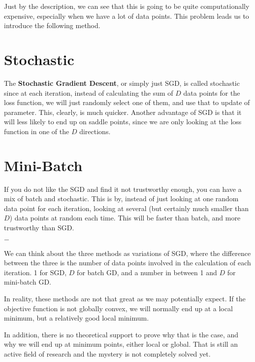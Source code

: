 \documentclass{article}
\theoremstyle{definition}
\newcommand{\breaking}{%
    \begin{center}
    $-$
    \end{center}%
}
\begin{document}
\bigskip

\noindent Just by the description, we can see that this is going to be quite computationally expensive, especially when we have a lot of data points. This problem leads us to introduce the following method.

\section{Stochastic}

\noindent The \textbf{Stochastic Gradient Descent}, or simply just SGD, is called stochastic since at each iteration, instead of calculating the sum of $D$ data points for the loss function, we will just randomly select one of them, and use that to update of parameter. This, clearly, is much quicker. Another advantage of SGD is that it will less likely to end up on saddle points, since we are only looking at the loss function in one of the $D$ directions. 

\section{Mini-Batch}

\noindent If you do not like the SGD and find it not trustworthy enough, you can have a mix of batch and stochastic. This is by, instead of just looking at one random data point for each iteration, looking at several (but certainly much smaller than $D$) data points at random each time. This will be faster than batch, and more trustworthy than SGD.  

\bigskip

\breaking

\bigskip

\noindent We can think about the three methods as variations of SGD, where the difference between the three is the number of data points involved in the calculation of each iteration. 1 for SGD, $D$ for batch GD, and a number in between 1 and $D$ for mini-batch GD. 

\bigskip

\noindent In reality, these methods are not that great as we may potentially expect. If the objective function is not globally convex, we will normally end up at a local minimum, but a relatively good local minimum. 

\bigskip

\noindent In addition, there is no theoretical support to prove why that is the case, and why we will end up at minimum points, either local or global. That is still an active field of research and the mystery is not completely solved yet. 
\end{document}

